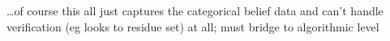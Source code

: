\documentclass[10pt,letterpaper]{article}
\begin{document}
\dots of course this all just captures the categorical belief data and can't handle verification (eg looks to residue set) at all; must bridge to algorithmic level





%




\setlength{\bibleftmargin}{.125in}
\setlength{\bibindent}{-\bibleftmargin}


\end{document}

